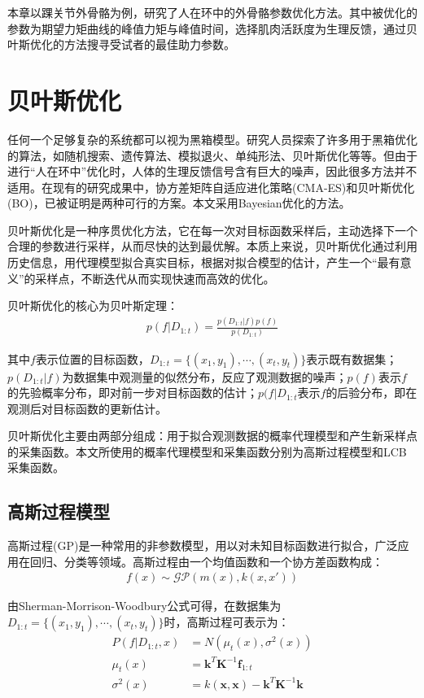本章以踝关节外骨骼为例，研究了人在环中的外骨骼参数优化方法。其中被优化的参数为期望力矩曲线的峰值力矩与峰值时间，选择肌肉活跃度为生理反馈，通过贝叶斯优化的方法搜寻受试者的最佳助力参数。

\section{贝叶斯优化}

任何一个足够复杂的系统都可以视为黑箱模型。研究人员探索了许多用于黑箱优化的算法\cite{p48}，如随机搜索、遗传算法、模拟退火、单纯形法、贝叶斯优化等等。但由于进行“人在环中”优化时，人体的生理反馈信号含有巨大的噪声，因此很多方法并不适用。在现有的研究成果中，协方差矩阵自适应进化策略\cite{p40}(CMA-ES)和贝叶斯优化\cite{p41}(BO)，已被证明是两种可行的方案。本文采用Bayesian优化的方法。

贝叶斯优化是一种序贯优化方法，它在每一次对目标函数采样后，主动选择下一个合理的参数进行采样，从而尽快的达到最优解。本质上来说，贝叶斯优化通过利用历史信息，用代理模型拟合真实目标，根据对拟合模型的估计，产生一个“最有意义”的采样点，不断迭代从而实现快速而高效的优化。

贝叶斯优化的核心为贝叶斯定理：
\begin{align}
    p(f|D_{1:t})=\frac{p(D_{1:t}|f)p(f)}{p(D_{1:t})}
\end{align}

其中$f$表示位置的目标函数，$D_{1:t} = \{(x_1,y_1),\cdots,(x_t,y_t)\}$表示既有数据集；$p(D_{1:t}|f)$为数据集中观测量的似然分布，反应了观测数据的噪声；$p(f)$表示$f$的先验概率分布，即对前一步对目标函数的估计；$p(f|D_{1:t}$表示$f$的后验分布，即在观测后对目标函数的更新估计。

贝叶斯优化主要由两部分组成：用于拟合观测数据的概率代理模型和产生新采样点的采集函数。本文所使用的概率代理模型和采集函数分别为高斯过程模型和LCB采集函数。

\subsection{高斯过程模型}

高斯过程(GP)是一种常用的非参数模型，用以对未知目标函数进行拟合，广泛应用在回归、分类等领域。高斯过程由一个均值函数和一个协方差函数构成：
\begin{align}
    f(x)\sim \mathcal{GP}(m(x),k(x,x'))
\end{align}

由Sherman-Morrison-Woodbury公式\cite{p49}可得，在数据集为$D_{1:t} = \{(x_1,y_1),\cdots,(x_t,y_t)\}$时，高斯过程可表示为：
\begin{align}
    P(f|D_{1:t},x) &= N(\mu_t(x),\sigma^2(x)) \\
    \mu_t(x) &= \mathbf{k}^T\mathbf{K}^{-1}\mathbf{f}_{1:t} \\
    \sigma^2(x) &= k(\mathbf{x},\mathbf{x}) - \mathbf{k}^T\mathbf{K}^{-1}\mathbf{k}
\end{align}

